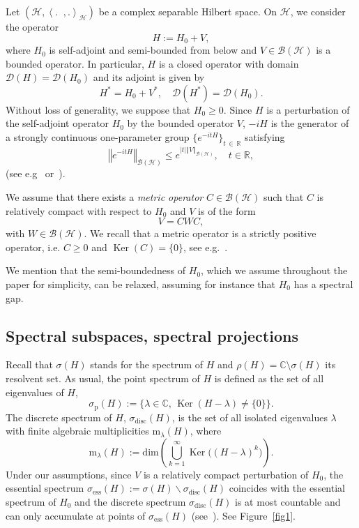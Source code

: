 \documentclass[AHL,Unicode,longabstracts,published]{cedram}
\newcommand{\Hi}{\mathcal{H}}
\newcommand{\bbC}{\mathbb{C}}
\newcommand{\R}{\mathbb{R}}
\newcommand{\ess}{\mathrm{ess}}
\newcommand{\rmp}{\mathrm{p}}
\newcommand{\rmm}{\mathrm{m}}
\newcommand{\disc}{\mathrm{disc}}
\newcommand{\norme}[1]{\left\Vert #1\right\Vert}
\newcommand{\scal}[2]{\left\langle{#1} \middle., {#2}\right\rangle}
\newcommand{\abso}[1]{\left|{#1}\right|}
\newcommand{\clB}{\mathcal{B}}
\newcommand{\clD}{\mathcal{D}}
\DeclareMathOperator{\Ker}{Ker}
\newcommand*\bbC{\mathbb{C}}
\newcommand{\Hi}{\mathcal{H}}
\newcommand{\rmp}{\mathrm{p}}
\newcommand{\R}{\mathbb{R}}
\newcommand{\ess}{\mathrm{ess}}
\begin{document}
Let $(\Hi,\scal{.}{.}_\Hi)$ be a complex separable Hilbert space. On $\Hi$, we consider the operator
\begin{equation}\label{eq:defH}
H:=H_0+V,
\end{equation}
where $H_0$ is self-adjoint and semi-bounded from below and $V\in\clB(\Hi)$ is a bounded operator. In particular, $H$ is a closed operator with domain $\clD(H)=\clD(H_0)$ and its adjoint is given by
\begin{equation*}
H^*=H_0+V^*, \quad \clD(H^*)=\clD(H_0).
\end{equation*}
Without loss of generality, we suppose that $H_0\geq 0$. Since $H$ is a perturbation of the self-adjoint operator $H_0$ by the bounded operator $V$, $-iH$ is the generator of a strongly continuous one-parameter group $\lbrace e^{-itH}\rbrace_{t\,\in\,\R}$ satisfying
\begin{equation*}
\norme{e^{-itH}}_{\clB(\Hi)}\leq e^{\abso{t}\norme{V}_{\clB(\Hi)}},\quad t\in\R,
\end{equation*}
(see e.g~\cite{Da07_01} or~\cite{EnNa20_01}).

We assume that there exists a \emph{metric operator} $C\in\clB(\Hi)$ such that $C$ is relatively compact with respect to $H_0$ and $V$ is of the form
\begin{equation}\label{eq:CWC}
V=CWC,
\end{equation}
with $W\in\clB(\Hi)$. We recall that a metric operator is a strictly positive operator, i.e. $C\ge0$ and $\Ker(C)=\{0\}$, see e.g.~\cite{AnTr12_12}.

We mention that the semi-boundedness of $H_0$, which we assume throughout the paper for simplicity, can be relaxed, assuming for instance that $H_0$ has a spectral gap.


\subsection{Spectral subspaces, spectral projections}\label{subsec:subspaces}

Recall that $\sigma(H)$ stands for the spectrum of $H$ and $\rho(H)=\bbC\setminus\sigma(H)$ its resolvent set. As usual, the point spectrum of $H$ is defined as the set of all eigenvalues of $H$,
\begin{equation*}
\sigma_{\rmp}(H):=\big\{\lambda \in \bbC, \, \Ker(H-\lambda)\neq\{0\}\big\}.
\end{equation*}
The discrete spectrum of $H$, $\sigma_\disc(H)$, is the set of all isolated eigenvalues $\lambda$ with finite algebraic multiplicities $\rmm_\lambda(H)$, where
\begin{equation*}
\rmm_\lambda(H):=\mathrm{dim}\left(\bigcup_{k=1}^\infty\Ker\big((H-\lambda)^k \big) \right).
\end{equation*}
Under our assumptions, since $V$ is a relatively compact perturbation of $H_0$, the essential spectrum $\sigma_{\ess}(H):=\sigma(H)\backslash\sigma_\disc(H)$ coincides with the essential spectrum of $H_0$ and the discrete spectrum $\sigma_{\disc}(H)$ is at most countable and can only accumulate at points of $\sigma_{\ess}(H)$ (see~\cite[Corollary~2 of Theorem~XIII.14]{ReSi80_01}). See Figure~\ref{fig1}.
\end{document}
